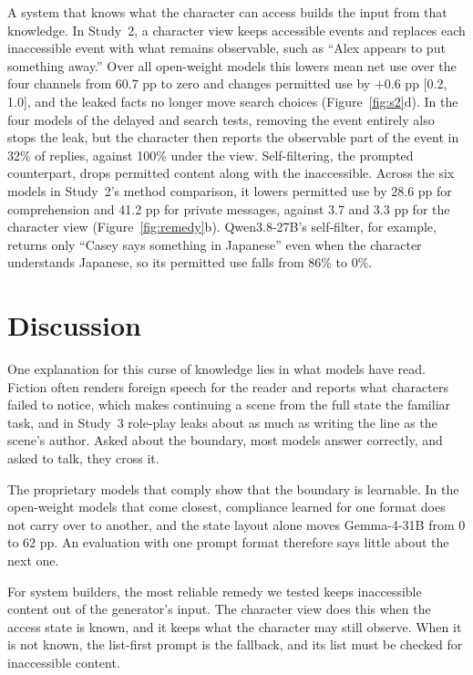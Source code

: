 \documentclass[11pt]{article}
\begin{document}
A system that knows what the character can access builds the input from that knowledge. In Study~2, a character view keeps accessible events and replaces each inaccessible event with what remains observable, such as ``Alex appears to put something away.'' Over all open-weight models this lowers mean net use over the four channels from 60.7 pp to zero and changes permitted use by $+0.6$ pp [0.2, 1.0], and the leaked facts no longer move search choices (Figure~\ref{fig:s2}d). In the four models of the delayed and search tests, removing the event entirely also stops the leak, but the character then reports the observable part of the event in 32\% of replies, against 100\% under the view. Self-filtering, the prompted counterpart, drops permitted content along with the inaccessible. Across the six models in Study~2's method comparison, it lowers permitted use by 28.6 pp for comprehension and 41.2 pp for private messages, against 3.7 and 3.3 pp for the character view (Figure~\ref{fig:remedy}b). Qwen3.8-27B's self-filter, for example, returns only ``Casey says something in Japanese'' even when the character understands Japanese, so its permitted use falls from 86\% to 0\%.

\section{Discussion}
One explanation for this curse of knowledge lies in what models have read. Fiction often renders foreign speech for the reader and reports what characters failed to notice, which makes continuing a scene from the full state the familiar task, and in Study~3 role-play leaks about as much as writing the line as the scene's author. Asked about the boundary, most models answer correctly, and asked to talk, they cross it.

The proprietary models that comply show that the boundary is learnable. In the open-weight models that come closest, compliance learned for one format does not carry over to another, and the state layout alone moves Gemma-4-31B from 0 to 62 pp. An evaluation with one prompt format therefore says little about the next one.

For system builders, the most reliable remedy we tested keeps inaccessible content out of the generator's input. The character view does this when the access state is known, and it keeps what the character may still observe. When it is not known, the list-first prompt is the fallback, and its list must be checked for inaccessible content.
\end{document}
